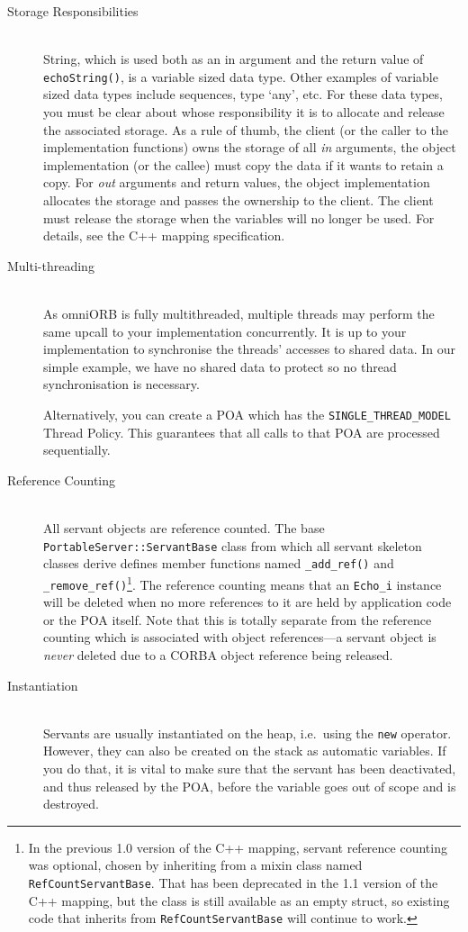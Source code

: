 \documentclass[11pt,twoside,a4paper]{book}
\newcommand{\type}[1]{\texttt{#1}}
\newcommand{\code}[1]{\texttt{#1}}
\newcommand{\op}[1]{\texttt{#1()}}
\newcommand{\dsc}{\discretionary{}{}{}}
\begin{document}
\begin{description}

\item[Storage Responsibilities]\mbox{}\\
%
String, which is used both as an in argument and the return value of
\op{echoString}, is a variable sized data type. Other examples of
variable sized data types include sequences, type `any', etc. For
these data types, you must be clear about whose responsibility it is
to allocate and release the associated storage. As a rule of thumb,
the client (or the caller to the implementation functions) owns the
storage of all \emph{in} arguments, the object implementation (or the
callee) must copy the data if it wants to retain a copy. For
\emph{out} arguments and return values, the object implementation
allocates the storage and passes the ownership to the client. The
client must release the storage when the variables will no longer be
used.  For details, see the C++ mapping specification.

\item[Multi-threading]\mbox{}\\
%
As omniORB is fully multithreaded, multiple threads may perform the
same upcall to your implementation concurrently. It is up to your
implementation to synchronise the threads' accesses to shared data.
In our simple example, we have no shared data to protect so no thread
synchronisation is necessary.

Alternatively, you can create a POA which has the
\code{SINGLE\_THREAD\_MODEL} Thread Policy. This guarantees that all
calls to that POA are processed sequentially.

\item[Reference Counting]\mbox{}\\
%
All servant objects are reference counted. The base
\type{PortableServer::\dsc{}ServantBase} class from which all servant
skeleton classes derive defines member functions named \op{\_add\_ref}
and \op{\_remove\_ref}\footnote{In the previous 1.0 version of the C++
mapping, servant reference counting was optional, chosen by inheriting
from a mixin class named \type{RefCountServantBase}. That has been
deprecated in the 1.1 version of the C++ mapping, but the class is
still available as an empty struct, so existing code that inherits
from \type{RefCountServantBase} will continue to work.}. The reference
counting means that an \type{Echo\_i} instance will be deleted when no
more references to it are held by application code or the POA
itself. Note that this is totally separate from the reference counting
which is associated with object references---a servant object is
\emph{never} deleted due to a CORBA object reference being released.

\item[Instantiation]\mbox{}\\
%
Servants are usually instantiated on the heap, i.e.\ using the
\code{new} operator. However, they can also be created on the stack as
automatic variables. If you do that, it is vital to make sure that the
servant has been deactivated, and thus released by the POA, before the
variable goes out of scope and is destroyed.

\end{description}
\end{document}
